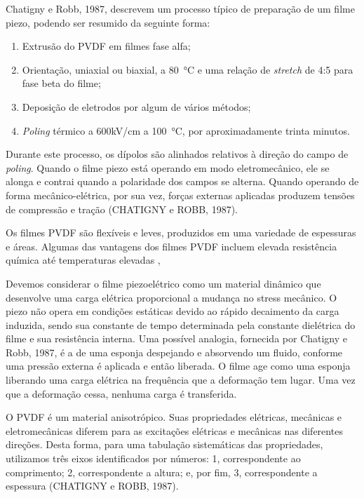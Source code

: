\documentclass[
	12pt,				
	oneside,			
	a4paper,			
	english,			
	brazil,			
	]{abntex2ppgsi}
\begin{document}
Chatigny e Robb, 1987, descrevem um processo típico de preparação de um filme piezo, podendo ser resumido da seguinte forma:

\begin{enumerate}
	\item Extrusão do PVDF em filmes fase alfa; 
	\item Orientação, uniaxial ou biaxial, a \SI{80}{\celsius} e uma relação de \textit{stretch} de 4:5 para fase beta do filme;
	\item Deposição de eletrodos por algum de vários métodos;
	\item \textit{Poling} térmico a 600kV/cm a \SI{100}{\celsius}, por aproximadamente trinta minutos.
\end{enumerate}

Durante este processo, os dípolos são alinhados relativos à direção do campo de \textit{poling}. Quando o filme piezo está operando em modo eletromecânico, ele se alonga e contrai quando a polaridade dos campos se alterna. Quando operando de forma mecânico-elétrica, por sua vez, forças externas aplicadas produzem tensões de compressão e tração (CHATIGNY e ROBB, 1987). 

Os filmes PVDF são flexíveis e leves, produzidos em uma variedade de espessuras e áreas. Algumas das vantagens dos filmes PVDF incluem elevada resistência química até temperaturas elevadas , 

Devemos considerar o filme piezoelétrico como um material dinâmico que desenvolve uma carga elétrica proporcional a mudança no stress mecânico. O piezo não opera em condições estáticas devido ao rápido decaimento da carga induzida, sendo sua constante de tempo determinada pela constante dielétrica do filme e sua resistência interna. 	Uma possível analogia, fornecida por Chatigny e Robb, 1987, é a de uma esponja despejando e absorvendo um fluido, conforme uma pressão externa é aplicada e então liberada. O filme age como uma esponja liberando uma carga elétrica na frequência que a deformação tem lugar. Uma vez que a deformação cessa, nenhuma carga é transferida. 

O PVDF é um material anisotrópico.  Suas propriedades elétricas, mecânicas e eletromecânicas diferem para as excitações elétricas e mecânicas nas diferentes direções. Desta forma, para uma tabulação sistemáticas das propriedades, utilizamos três eixos identificados por números: 1, correspondente ao comprimento; 2, correspondente a altura; e, por fim, 3, correspondente a espessura (CHATIGNY e ROBB, 1987). 
\end{document}
